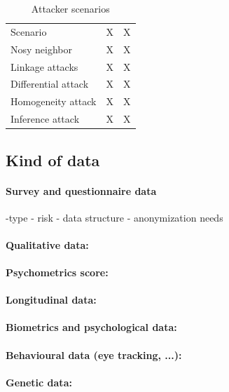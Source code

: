 \documentclass{article}
\begin{document}
\begin{table}[H]
    \centering
    \begin{tabular}{lcc}
        Scenario & X & X \\
        Nosy neighbor & X & X \\
        Linkage attacks & X & X \\
        Differential attack & X & X \\
        Homogeneity attack & X & X \\
        Inference attack & X & X \\
    \end{tabular}
    \caption{Attacker scenarios}
    \label{tab:tab1}
\end{table}

\subsection{Kind of data}

\paragraph{Survey and questionnaire data}
-type
- risk
- data structure
- anonymization needs

\paragraph{Qualitative data:}

\paragraph{Psychometrics score:}

\paragraph{Longitudinal data:}

\paragraph{Biometrics and psychological data:}

\paragraph{Behavioural data (eye tracking, ...):}

\paragraph{Genetic data:}
\end{document}
